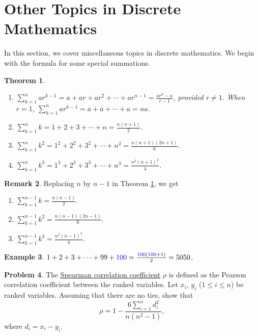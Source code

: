 \documentclass[12pt,letterpaper]{book}
\def\blue{\textcolor{blue}}
\numberwithin{equation}{section}
\newtheorem{thm}{\textbf{Theorem}}[section]
\theoremstyle{definition}
\newtheorem{problem}[thm]{\textbf{Problem}}
\newtheorem{example}[thm]{\textbf{Example}}
\newtheorem{remark}[thm]{\textbf{Remark}}
\begin{document}
\section{Other Topics in Discrete Mathematics}

In this section, we cover miscellaneous topics in discrete mathematics. We begin with the formula for some special summations.

\begin{thm}\label{special summation} \quad
\begin{enumerate}
\item\label{finite geometric} $\displaystyle{\sum_{k=1}^n ar^{k-1} = a+ar+ar^2+\cdots+ar^{n-1}=\frac{ar^n-a}{r-1}}$, provided $r\neq 1$. When $r=1$, $\displaystyle{\sum_{k=1}^n ar^{k-1} = a+a+\cdots+a=na}$.
\item $\displaystyle{\sum_{k=1}^n k=1+2+3+\cdots+n=\frac{n(n+1)}{2}}$.
\item $\displaystyle{\sum_{k=1}^n k^2=1^2+2^2+3^2+\cdots+n^2=\frac{n(n+1)(2n+1)}{6}}$.
\item $\displaystyle{\sum_{k=1}^n k^3=1^3+2^3+3^3+\cdots+n^3=\frac{n^2(n+1)^2}{4}}$.
\end{enumerate}
\end{thm}

\begin{remark}
Replacing $n$ by $n-1$ in Theorem \ref{special summation}, we get
\begin{enumerate}
\item $\displaystyle{\sum_{k=1}^{n-1} k=\frac{n(n-1)}{2}}$.
\item $\displaystyle{\sum_{k=1}^{n-1} k^2=\frac{n(n-1)(2n-1)}{6}}$.
\item $\displaystyle{\sum_{k=1}^{n-1} k^3=\frac{n^2(n-1)^2}{4}}$.
\end{enumerate}
\end{remark}

\begin{example}
$1+2+3+\cdots+99+\blue{100}=\frac{\blue{100}(\blue{100}+1)}{2}=5050$.
\end{example}

\begin{problem}
The \underline{Spearman correlation coefficient} $\rho$ is defined as the Pearson correlation coefficient between the ranked variables. Let $x_i$, $y_i$ ($1\leq i \leq n$) be ranked variables. Assuming that there are no ties, show that
$$\rho=1-\frac{6\sum_{i=1}^n d_i^2}{n(n^2-1)},$$
where $d_i=x_i-y_i$.
\end{problem}
\end{document}

